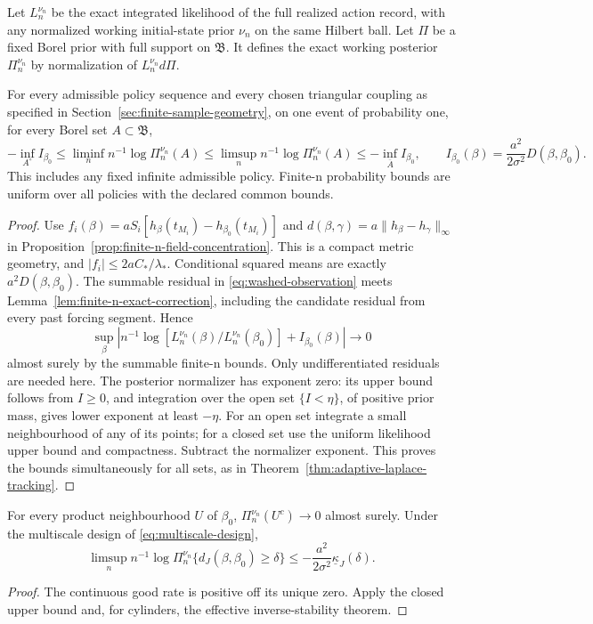Let \(L_n^{\nu_n}\) be the exact integrated likelihood of the full
realized action record, with any normalized working initial-state prior
\(\nu_n\) on the same Hilbert ball. Let \(\Pi\) be a fixed Borel prior
with full support on \(\mathfrak B\). It defines the exact working
posterior \(\Pi_n^{\nu_n}\) by normalization of \(L_n^{\nu_n}d\Pi\).

\begin{theorem}
\label{thm:jacobi-rate}
For every admissible policy sequence and every chosen triangular coupling
as specified in Section~\ref{sec:finite-sample-geometry}, on one event of
probability one, for every Borel set \(A\subset\mathfrak B\),
\begin{equation}
 -\inf_{A^\circ}I_{\beta_0}\le
 \liminf_n n^{-1}\log\Pi_n^{\nu_n}(A)\le
 \limsup_n n^{-1}\log\Pi_n^{\nu_n}(A)
 \le-\inf_{\overline A}I_{\beta_0},\qquad
 I_{\beta_0}(\beta)=\frac{a^2}{2\sigma^2}D(\beta,\beta_0).
 \label{eq:jacobi-posterior-ldp}
\end{equation}
This includes any fixed infinite admissible policy. Finite-n probability
bounds are uniform over all policies with the declared common bounds.
\end{theorem}
\begin{proof}
Use \(f_i(\beta)=aS_i[h_\beta(t_{M_i})-h_{\beta_0}(t_{M_i})]\)
and \(d(\beta,\gamma)=a\|h_\beta-h_\gamma\|_\infty\) in
Proposition~\ref{prop:finite-n-field-concentration}. This is a compact
metric geometry, and \(|f_i|\le2aC_*/\lambda_*\).
Conditional squared means are exactly \(a^2D(\beta,\beta_0)\).
The summable residual in \eqref{eq:washed-observation} meets
Lemma~\ref{lem:finite-n-exact-correction}, including the candidate residual
from every past forcing segment. Hence
\[
 \sup_\beta|n^{-1}\log[L_n^{\nu_n}(\beta)/L_n^{\nu_n}(\beta_0)]
             +I_{\beta_0}(\beta)|\to0
\]
almost surely by the summable finite-n bounds. Only undifferentiated
residuals are needed here.
The posterior normalizer has exponent zero: its upper bound follows from
\(I\ge0\), and integration over the open set \(\{I<\eta\}\), of positive
prior mass, gives lower exponent at least \(-\eta\).
For an open set integrate a small neighbourhood of any of its points;
for a closed set use the uniform likelihood upper bound and compactness.
Subtract the normalizer exponent. This proves the bounds simultaneously
for all sets, as in Theorem~\ref{thm:adaptive-laplace-tracking}.
\end{proof}

\begin{corollary}
\label{thm:jacobi-consistency}
For every product neighbourhood \(U\) of \(\beta_0\),
\(\Pi_n^{\nu_n}(U^c)\to0\) almost surely. Under the multiscale design
of \eqref{eq:multiscale-design},
\[
 \limsup_n n^{-1}\log\Pi_n^{\nu_n}\{d_J(\beta,\beta_0)\ge\delta\}
 \le-\frac{a^2}{2\sigma^2}\underline\kappa_J(\delta).
\]
\end{corollary}
\begin{proof}
The continuous good rate is positive off its unique zero. Apply the closed
upper bound and, for cylinders, the effective inverse-stability theorem.
\end{proof}

